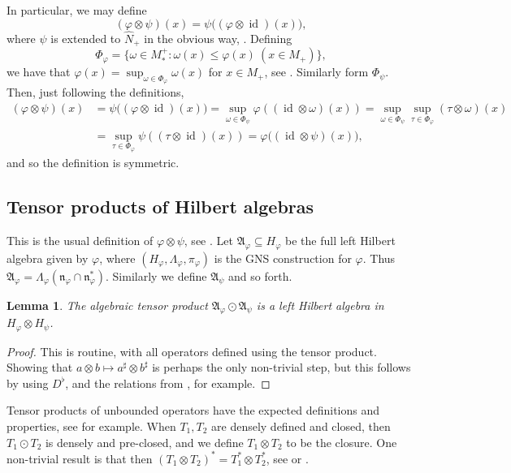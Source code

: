 \documentclass[a4paper,11pt]{article}
\theoremstyle{plain}
\newtheorem{lemma}[proposition]{Lemma}
\theoremstyle{remark}
\newcommand{\mf}[1]{\mathfrak{#1}}
\newcommand{\id}{\operatorname{id}}
\newcommand{\hh}{\widehat}
\begin{document}
In particular, we may define
\[ (\varphi\otimes\psi)(x) = \psi\big( (\varphi\otimes\id)(x) \big), \]
where $\psi$ is extended to $\hh N_+$ in the obvious way, \cite[Corollary~IX.4.9]{TakesakiII}.  Defining
\[ \Phi_\varphi = \{ \omega\in M_*^+ : \omega(x) \leq \varphi(x) \ (x\in M_+) \}, \]
we have that $\varphi(x) = \sup_{\omega\in\Phi_\varphi} \omega(x)$ for $x\in M_+$, see \cite[Theorem~VII.1.11]{TakesakiII}.  Similarly form $\Phi_\psi$.  Then, just following the definitions,
\begin{align*}
(\varphi\otimes\psi)(x)
&= \psi\big( (\varphi\otimes\id)(x) \big)
= \sup_{\omega\in\Phi_\psi} \varphi((\id\otimes\omega)(x))
= \sup_{\omega\in\Phi_\psi} \sup_{\tau\in\Phi_\varphi} (\tau\otimes\omega)(x) \\
&= \sup_{\tau\in\Phi_\varphi} \psi( (\tau\otimes\id)(x) )
= \varphi\big( (\id\otimes\psi)(x) \big),
\end{align*}
and so the definition is symmetric.



\subsection{Tensor products of Hilbert algebras}

This is the usual definition of $\varphi\otimes\psi$, see \cite[Definition~VIII.4.2]{TakesakiII}.  Let $\mf A_\varphi \subseteq H_\varphi$ be the full left Hilbert algebra given by $\varphi$, where $(H_\varphi, \Lambda_\varphi, \pi_\varphi)$ is the GNS construction for $\varphi$.  Thus $\mf A_\varphi = \Lambda_\varphi(\mf n_\varphi \cap \mf n_\varphi^*)$.  Similarly we define $\mf A_\psi$ and so forth.

\begin{lemma}
The algebraic tensor product $\mf A_\varphi \odot \mf A_\psi$ is a left Hilbert algebra in $H_\varphi \otimes H_\psi$.
\end{lemma}
\begin{proof}
This is routine, with all operators defined using the tensor product.  Showing that $a\otimes b \mapsto a^\sharp \otimes b^\sharp$ is perhaps the only non-trivial step, but this follows by using $D^\flat$, and the relations from \cite[Lemma~VI.1.5]{TakesakiII}, for example.
\end{proof}

Tensor products of unbounded operators have the expected definitions and properties, see \cite[Section~7.5]{Schmudgen_UnboundedBook} for example.  When $T_1,T_2$ are densely defined and closed, then $T_1\odot T_2$ is densely and pre-closed, and we define $T_1\otimes T_2$ to be the closure.  One non-trivial result is that then $(T_1\otimes T_2)^* = T_1^*\otimes T_2^*$, see \cite[Proposition~7.26]{Schmudgen_UnboundedBook} or \cite[Lemma~VIII.4.1]{TakesakiII}.
\end{document}
